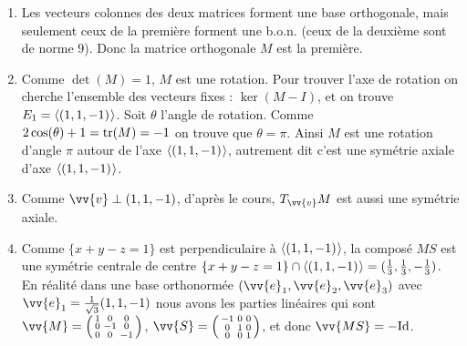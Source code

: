 \documentclass[a4paper,12pt,reqno]{amsart}
\begin{document}
\begin{solution}


  \begin{enumerate}
    \item Les vecteurs colonnes des deux matrices forment une base orthogonale, mais seulement ceux de la première forment une b.o.n. (ceux de la deuxième sont de norme $9$). Donc la matrice orthogonale $M$ est la première.
    \item Comme $\det(M)=1$, $M$ est une rotation. Pour trouver l'axe de rotation on cherche l'ensemble des vecteurs fixes : $\ker(M-I)$, et on trouve $E_{1}=\langle{(1,1,-1)}\kern.07em\rangle$. Soit $\theta$ l'angle de rotation. Comme $2\cos(\theta)+1=\operatorname{tr}(M)=-1$ on trouve que $\theta=\pi$. Ainsi $M$ est une rotation d'angle $\pi$ autour de l'axe $\langle{(1,1,-1)}\kern.07em\rangle$, autrement dit c'est une symétrie axiale d'axe $\langle{(1,1,-1)}\kern.07em\rangle$.
    \item Comme $\vv{v} \perp (1,1,-1)$, d'après le cours, $T_{\vv{v}}M$ est aussi une symétrie axiale.
    \item Comme $\{x+y-z=1\}$ est perpendiculaire à $\langle{(1,1,-1)}\kern.07em\rangle$, la composé $MS$ est une symétrie centrale de centre $\{x+y-z=1\} \cap \langle{(1,1,-1)}\kern.07em\rangle = {(\frac13,\frac13,-\frac13)}$. En réalité dans une base orthonormée $(\vv{e}_{1}, \vv{e}_{2}, \vv{e}_{3})$ avec $\vv{e}_{1}=\frac{1}{\sqrt{3}}(1,1,-1)$ nous avons les parties linéaires qui sont $\vv{M}=\begin{psmallmatrix}1&0&0\\0&-1&0\\0&0&-1\end{psmallmatrix}$, $\vv{S}=\begin{psmallmatrix}-1&0&0\\0&1&0\\0&0&1\end{psmallmatrix}$, et donc $\vv{MS}=-\id$.
  \end{enumerate}
\end{solution}
\end{document}
